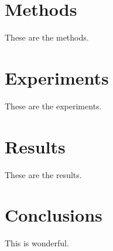 \documentclass[10pt,twocolumn,letterpaper]{article}
\begin{document}
\section{Methods}

These are the methods.

\section{Experiments}

These are the experiments.

\section{Results}

These are the results.

\section{Conclusions}

This is wonderful.

{\small


}
\end{document}
